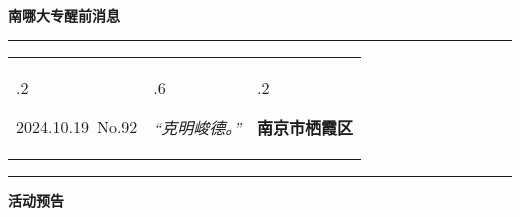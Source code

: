 \documentclass[letterpaper, 12pt]{article}
\begin{document}
\begin{center}
    \Huge\textbf{南哪大专醒前消息}
\end{center}
\vspace{4mm}
\hrule
\renewcommand\tabularxcolumn[1]{m{#1}}
\begin{tabularx}{\textwidth}{>{\hsize.2\hsize}X>{\hsize.6\hsize}X>{\hsize.2\hsize}X}
    \begin{flushleft}
        2024.10.19\, No.92
    \end{flushleft}
    &
    \begin{center}
        \textit{“克明峻德。”}
    \end{center}
    &
    \begin{flushright}
        \textbf{南京市栖霞区}
    \end{flushright}
\end{tabularx}
\vspace{-3.5mm}
\hrule
\vspace{4mm}
\centerline{\huge\textbf{活动预告}}
\end{document}
